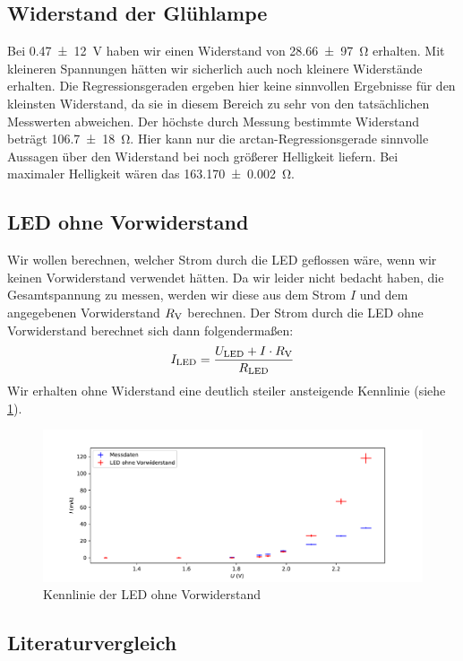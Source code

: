 \documentclass[parskip, 12pt, DIV=16, openany]{scrartcl}
\begin{document}
\subsection{Widerstand der Glühlampe}

Bei \SI{0,47(12)}{\V} haben wir einen Widerstand von \SI{28,66(97)}{\ohm} erhalten. Mit kleineren Spannungen hätten wir sicherlich auch noch kleinere Widerstände erhalten. Die Regressionsgeraden ergeben hier keine sinnvollen Ergebnisse für den kleinsten Widerstand, da sie in diesem Bereich zu sehr von den tatsächlichen Messwerten abweichen.
Der höchste durch Messung bestimmte Widerstand beträgt \SI{106,7(18)}{\ohm}. Hier kann nur die arctan-Regressionsgerade sinnvolle Aussagen über den Widerstand bei noch größerer Helligkeit liefern. Bei maximaler Helligkeit wären das \SI{163.170(2)}{\ohm}.

\subsection{LED ohne Vorwiderstand}

Wir wollen berechnen, welcher Strom durch die LED geflossen wäre, wenn wir keinen Vorwiderstand verwendet hätten. Da wir leider nicht bedacht haben, die Gesamtspannung zu messen, werden wir diese aus dem Strom $I$ und dem angegebenen Vorwiderstand $R_{\rm{V}}$ berechnen. Der Strom durch die LED ohne Vorwiderstand berechnet sich dann folgendermaßen:
\[
I_{\rm{LED}} = \frac{U_{\rm{LED}}+I \cdot R_{\rm{V}}}{R_{\rm{LED}}}
\]
Wir erhalten ohne Widerstand eine deutlich steiler ansteigende Kennlinie (siehe \cref{fig5}).
\begin{figure}
\includegraphics[width=\linewidth]{plot5}%

\caption{Kennlinie der LED ohne Vorwiderstand}\label{fig5}
\end{figure}
\subsection{Literaturvergleich}
\end{document}

